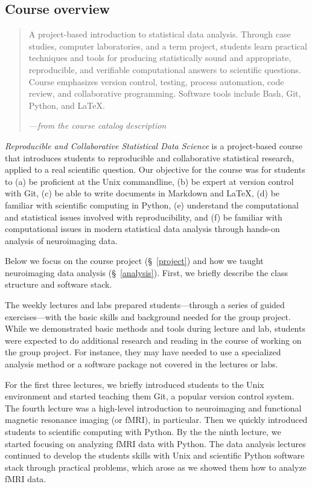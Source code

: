 \subsection{Course overview}

\begin{quote}
A project-based introduction to statistical data analysis. Through case
studies, computer laboratories, and a term project, students learn
practical techniques and tools for producing statistically sound and
appropriate, reproducible, and verifiable computational answers to
scientific questions. Course emphasizes version control, testing,
process automation, code review, and collaborative programming.
Software tools include Bash, Git, Python, and \LaTeX.

\hfill\emph{---from the course catalog description}
\end{quote}

\emph{Reproducible and Collaborative Statistical Data Science} is a
project-based course that introduces students to reproducible and collaborative
statistical research, applied to a real scientific question.
Our objective for the course was for students to
(a) be proficient at the Unix commandline,
(b) be expert at version control with Git,
(c) be able to write documents in Markdown and \LaTeX,
(d) be familiar with scientific computing in Python,
(e) understand the computational and statistical issues involved with reproducibility, and
(f) be familiar with computational issues in modern statistical data
analysis through hands-on analysis of neuroimaging data.

Below we focus on the course project (\S~\ref{project}) and
how we taught neuroimaging data analysis (\S~\ref{analysis}).
First, we briefly describe the class structure and software stack.

The weekly lectures and labs prepared students---through a
series of guided exercises---with the basic skills and
background needed for the group project.
While we demonstrated basic methods and tools during lecture and lab,
students were expected to do additional research and reading in the course
of working on the group project.
For instance, they may have needed to use a specialized analysis
method or a software package not covered in the lectures or labs.

For the first three lectures, we briefly introduced students to the Unix
environment and started teaching them Git, a popular version control system.
The fourth lecture was a high-level introduction to neuroimaging and
functional magnetic resonance imaging (or fMRI), in particular.
Then we quickly introduced students to scientific computing with Python.
By the the ninth lecture, we started focusing on analyzing fMRI data
with Python.
The data analysis lectures continued to develop the students skills with
Unix and scientific Python software stack through practical problems,
which arose as we showed them how to analyze fMRI data.

